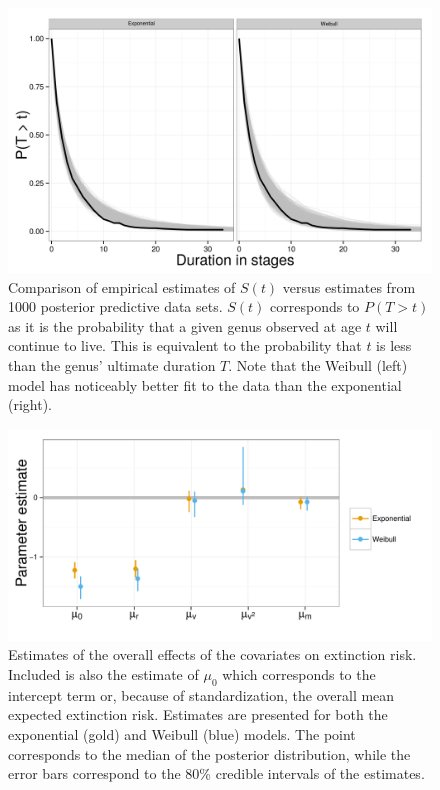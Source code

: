 \documentclass[12pt,letterpaper]{article}
\begin{document}
\begin{figure}[ht]
  \centering
  \includegraphics[height = 0.5\textheight,width=\textwidth,keepaspectratio=true]{figure/survival_curves}
  \caption{Comparison of empirical estimates of \(S(t)\) versus estimates from 1000 posterior predictive data sets. \(S(t)\) corresponds to \(P(T > t)\) as it is the probability that a given genus observed at age \(t\) will continue to live. This is equivalent to the probability that \(t\) is less than the genus' ultimate duration \(T\). Note that the Weibull (left) model has noticeably better fit to the data than the exponential (right).}
  \label{fig:surv}
\end{figure}

\begin{figure}[ht]
  \centering
  \includegraphics[height = 0.5\textheight,width=\textwidth,keepaspectratio=true]{figure/coef_means}
  \caption{Estimates of the overall effects of the covariates on extinction risk. Included is also the estimate of \(\mu_{0}\) which corresponds to the intercept term or, because of standardization, the overall mean expected extinction risk. Estimates are presented for both the exponential (gold) and Weibull (blue) models. The point corresponds to the median of the posterior distribution, while the error bars correspond to the 80\% credible intervals of the estimates.}
  \label{fig:mu}
\end{figure}
\end{document}
